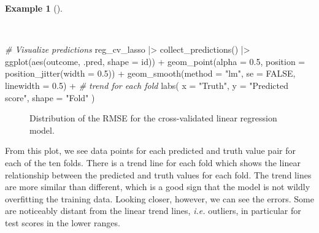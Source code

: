 \documentclass[
  letterpaper,
  DIV=11,
  numbers=noendperiod]{scrreprt}
\newenvironment{Shaded}{\begin{snugshade}}{\end{snugshade}}
\newcommand{\AttributeTok}[1]{\textcolor[rgb]{0.00,0.00,0.00}{#1}}
\newcommand{\CommentTok}[1]{\textcolor[rgb]{0.00,0.00,0.00}{\textit{#1}}}
\newcommand{\ConstantTok}[1]{\textcolor[rgb]{0.00,0.00,0.00}{#1}}
\newcommand{\FloatTok}[1]{\textcolor[rgb]{0.00,0.00,0.00}{#1}}
\newcommand{\FunctionTok}[1]{\textcolor[rgb]{0.00,0.00,0.00}{#1}}
\newcommand{\NormalTok}[1]{\textcolor[rgb]{0.00,0.00,0.00}{#1}}
\newcommand{\SpecialCharTok}[1]{\textcolor[rgb]{0.00,0.00,0.00}{#1}}
\newcommand{\StringTok}[1]{\textcolor[rgb]{0.00,0.00,0.00}{#1}}
\theoremstyle{definition}
\newtheorem{example}{Example}[chapter]
\theoremstyle{remark}
\begin{document}
\begin{example}[]\protect\hypertarget{exm-pda-reg-lr-eval-rmse}{}\label{exm-pda-reg-lr-eval-rmse}

~

\begin{Shaded}
\begin{Highlighting}[]
\CommentTok{\# Visualize predictions}
\NormalTok{reg\_cv\_lasso }\SpecialCharTok{|\textgreater{}}
  \FunctionTok{collect\_predictions}\NormalTok{() }\SpecialCharTok{|\textgreater{}}
  \FunctionTok{ggplot}\NormalTok{(}\FunctionTok{aes}\NormalTok{(outcome, .pred, }\AttributeTok{shape =}\NormalTok{ id)) }\SpecialCharTok{+}
  \FunctionTok{geom\_point}\NormalTok{(}\AttributeTok{alpha =} \FloatTok{0.5}\NormalTok{, }\AttributeTok{position =} \FunctionTok{position\_jitter}\NormalTok{(}\AttributeTok{width =} \FloatTok{0.5}\NormalTok{)) }\SpecialCharTok{+}
  \FunctionTok{geom\_smooth}\NormalTok{(}\AttributeTok{method =} \StringTok{"lm"}\NormalTok{, }\AttributeTok{se =} \ConstantTok{FALSE}\NormalTok{, }\AttributeTok{linewidth =} \FloatTok{0.5}\NormalTok{) }\SpecialCharTok{+} \CommentTok{\# trend for each fold}
  \FunctionTok{labs}\NormalTok{(}
    \AttributeTok{x =} \StringTok{"Truth"}\NormalTok{,}
    \AttributeTok{y =} \StringTok{"Predicted score"}\NormalTok{,}
    \AttributeTok{shape =} \StringTok{"Fold"}
\NormalTok{  )}
\end{Highlighting}
\end{Shaded}

\begin{figure}[H]


\caption{\label{fig-pda-reg-lr-eval-rmse}Distribution of the RMSE for
the cross-validated linear regression model.}

\end{figure}%

\end{example}

From this plot, we see data points for each predicted and truth value
pair for each of the ten folds. There is a trend line for each fold
which shows the linear relationship between the predicted and truth
values for each fold. The trend lines are more similar than different,
which is a good sign that the model is not wildly overfitting the
training data. Looking closer, however, we can see the errors. Some are
noticeably distant from the linear trend lines, \emph{i.e.} outliers, in
particular for test scores in the lower ranges.
\end{document}
